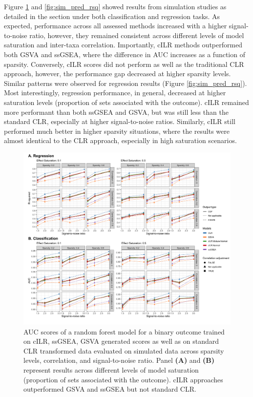 \documentclass{article}
\begin{document}
Figure \ref{fig:sim_pred_auc} and \ref{fig:sim_pred_rsq} showed results from simulation studies as detailed in the  section under both classification and regression tasks. As expected, performance across all assessed methods increased with a higher signal-to-noise ratio, however, they remained consistent across different levels of model saturation and inter-taxa correlation. Importantly, cILR methods outperformed both GSVA and ssGSEA, where the difference in AUC increases as a function of sparsity. Conversely, cILR scores did not perform as well as the traditional CLR approach, however, the performance gap decreased at higher sparsity levels. Similar patterns were observed for regression results (Figure \ref{fig:sim_pred_rsq}). Most interestingly, regression performance, in general, decreased at higher saturation levels (proportion of sets associated with the outcome). cILR remained more performant than both ssGSEA and GSVA, but was still less than the standard CLR, especially at higher signal-to-noise ratios. Similarly, cILR still performed much better in higher sparsity situations, where the results were almost identical to the CLR approach, especially in high saturation scenarios.     

\begin{figure}[H]
    \centering
    \includegraphics[width = \textwidth]{figures/sim_pred_combined.png}
    \caption{AUC scores of a random forest model for a binary outcome trained on cILR, ssGSEA, GSVA generated scores as well as on standard CLR transformed data evaluated on simulated data across sparsity levels, correlation, and signal-to-noise ratio. Panel \textbf{(A)} and \textbf{(B)} represent results across different levels of model saturation (proportion of sets associated with the outcome). cILR approaches outperformed GSVA and ssGSEA but not standard CLR.}
    \label{fig:sim_pred_auc}
\end{figure}
\end{document}
